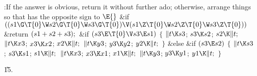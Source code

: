 \Y\B\4:If the answer is obvious, return it without further ado; otherwise,
arrange things so that  has the opposite sign to \X${}\E{}$\6
\&{if} ${}((\\{s1}\G\T{0}\W\\{s2}\G\T{0}\W\\{s3}\G\T{0})\V(\\{s1}\Z\T{0}\W%
\\{s2}\Z\T{0}\W\\{s3}\Z\T{0})){}$\1\5
\&{return} ${}(\\{s1}+\\{s2}+\\{s3});{}$\2\6
\&{if} ${}(\\{s3}\E\T{0}\V\\{s3}\E\\{s1}){}$\5
${}\{{}$\1\6
${}\|t\K\\{s3}{}$;\5
${}\\{s3}\K\\{s2}{}$;\5
${}\\{s2}\K\|t;{}$\6
${}\|t\K\\{x3}{}$;\5
${}\\{x3}\K\\{x2}{}$;\5
${}\\{x2}\K\|t;{}$\6
${}\|t\K\\{y3}{}$;\5
${}\\{y3}\K\\{y2}{}$;\5
${}\\{y2}\K\|t;{}$\6
\4${}\}{}$\5
\2\&{else} \&{if} ${}(\\{s3}\E\\{s2}){}$\5
${}\{{}$\1\6
${}\|t\K\\{s3}{}$;\5
${}\\{s3}\K\\{s1}{}$;\5
${}\\{s1}\K\|t;{}$\6
${}\|t\K\\{x3}{}$;\5
${}\\{x3}\K\\{x1}{}$;\5
${}\\{x1}\K\|t;{}$\6
${}\|t\K\\{y3}{}$;\5
${}\\{y3}\K\\{y1}{}$;\5
${}\\{y1}\K\|t;{}$\6
\4${}\}{}$\2\par
\U15.\fi

